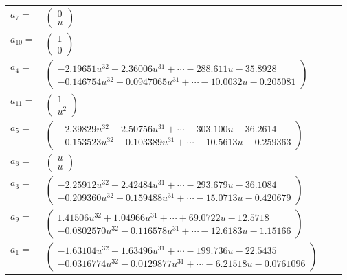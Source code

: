 \documentclass[1p]{elsarticle_modified}
\theoremstyle{definition}
\begin{document}
\begin{tabular}{m{7pt} m{180pt} m{7pt} m{180pt} }
\flushright $a_{7}=$&$\begin{pmatrix}0\\u\end{pmatrix}$ \\
\flushright $a_{10}=$&$\begin{pmatrix}1\\0\end{pmatrix}$ \\
\flushright $a_{4}=$&$\begin{pmatrix}-2.19651 u^{32}-2.36006 u^{31}+\cdots-288.611 u-35.8928\\-0.146754 u^{32}-0.0947065 u^{31}+\cdots-10.0032 u-0.205081\end{pmatrix}$ \\
\flushright $a_{11}=$&$\begin{pmatrix}1\\u^2\end{pmatrix}$ \\
\flushright $a_{5}=$&$\begin{pmatrix}-2.39829 u^{32}-2.50756 u^{31}+\cdots-303.100 u-36.2614\\-0.153523 u^{32}-0.103389 u^{31}+\cdots-10.5613 u-0.259363\end{pmatrix}$ \\
\flushright $a_{6}=$&$\begin{pmatrix}u\\u\end{pmatrix}$ \\
\flushright $a_{3}=$&$\begin{pmatrix}-2.25912 u^{32}-2.42484 u^{31}+\cdots-293.679 u-36.1084\\-0.209360 u^{32}-0.159488 u^{31}+\cdots-15.0713 u-0.420679\end{pmatrix}$ \\
\flushright $a_{9}=$&$\begin{pmatrix}1.41506 u^{32}+1.04966 u^{31}+\cdots+69.0722 u-12.5718\\-0.0802570 u^{32}-0.116578 u^{31}+\cdots-12.6183 u-1.15166\end{pmatrix}$ \\
\flushright $a_{1}=$&$\begin{pmatrix}-1.63104 u^{32}-1.63496 u^{31}+\cdots-199.736 u-22.5435\\-0.0316774 u^{32}-0.0129877 u^{31}+\cdots-6.21518 u-0.0761096\end{pmatrix}$ \\

\end{tabular}
\end{document}
